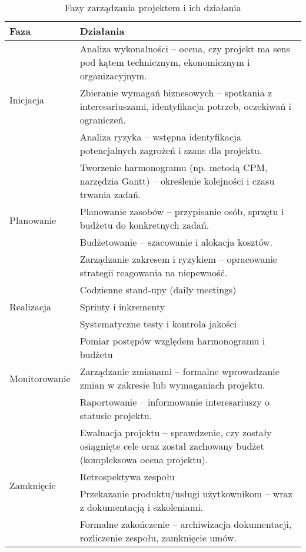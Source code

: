 \begin{table}[htbp]
\centering
\small
\begin{tabular}{|p{2.8cm}|p{9.7cm}|}
\hline
\textbf{Faza} & \textbf{Działania} \\
\hline
\multirow{3}{*}{Inicjacja} & Analiza wykonalności – ocena, czy projekt ma sens pod kątem technicznym, ekonomicznym i organizacyjnym. \\
& Zbieranie wymagań biznesowych – spotkania z interesariuszami, identyfikacja potrzeb, oczekiwań i ograniczeń. \\
& Analiza ryzyka – wstępna identyfikacja potencjalnych zagrożeń i szans dla projektu. \\
\hline
\multirow{4}{*}{Planowanie} & Tworzenie harmonogramu (np. metodą CPM, narzędzia Gantt) – określenie kolejności i czasu trwania zadań. \\
& Planowanie zasobów – przypisanie osób, sprzętu i budżetu do konkretnych zadań. \\
& Budżetowanie – szacowanie i alokacja kosztów. \\
& Zarządzanie zakresem i ryzykiem – opracowanie strategii reagowania na niepewność. \\
\hline
\multirow{3}{*}{Realizacja} & Codzienne stand-upy (daily meetings) \\
& Sprinty i inkrementy \\
& Systematyczne testy i kontrola jakości \\
\hline
\multirow{3}{*}{Monitorowanie} & Pomiar postępów względem harmonogramu i budżetu \\
& Zarządzanie zmianami – formalne wprowadzanie zmian w zakresie lub wymaganiach projektu. \\
& Raportowanie – informowanie interesariuszy o statusie projektu. \\
\hline
\multirow{4}{*}{Zamknięcie} & Ewaluacja projektu – sprawdzenie, czy zostały osiągnięte cele oraz został zachowany budżet (kompleksowa ocena projektu). \\
& Retrospektywa zespołu \\
& Przekazanie produktu/usługi użytkownikom – wraz z dokumentacją i szkoleniami. \\
& Formalne zakończenie – archiwizacja dokumentacji, rozliczenie zespołu, zamknięcie umów. \\
\hline
\end{tabular}
\caption{Fazy zarządzania projektem i ich działania}
\label{tab:project-phases}
\end{table}
